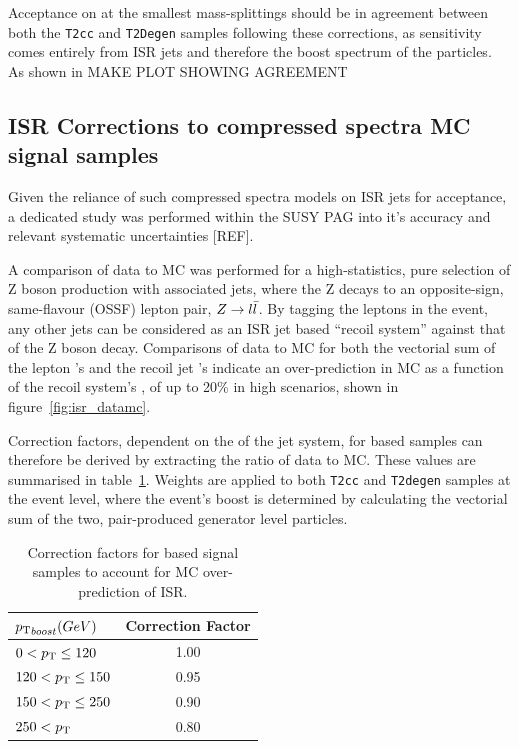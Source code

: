 Acceptance on at the smallest mass-splittings should be in agreement between 
both the \texttt{T2cc} and \texttt{T2Degen} samples following these corrections,
as sensitivity comes entirely from ISR jets and therefore the boost spectrum of 
the \sTop particles. As shown in MAKE PLOT SHOWING AGREEMENT

\subsection{ISR Corrections to compressed spectra MC signal samples}
\label{sec:isr_reweighting}

Given the reliance of such compressed spectra models on ISR jets for acceptance,
a dedicated study was performed within the SUSY PAG into it's accuracy and 
relevant systematic uncertainties [REF].

A comparison of data to MC was performed for a high-statistics, pure selection of Z boson 
production with associated jets, where the Z decays to an opposite-sign,
same-flavour (OSSF) lepton pair, $Z\rightarrow l\bar{l}$. By tagging the leptons in 
the event, any other jets can be considered as an ISR jet based ``recoil system'' 
against that of the Z boson decay. Comparisons of data to MC for both the 
vectorial sum of the lepton \Ptvect's and the recoil jet \Ptvect's indicate an
over-prediction in MC as a function of the recoil system's \Pt, of up to 20\% in 
high \Pt scenarios, shown in figure~\ref{fig:isr_datamc}.

Correction factors, dependent on the \Pt of the jet system, for \MADGRAPH based
samples can therefore be derived by extracting the ratio of data to MC. These 
values are summarised in table~\ref{tab:isr_weights}. Weights are applied to 
both \texttt{T2cc} and \texttt{T2degen} samples at the event level, where the 
event's boost \Pt is determined by calculating the vectorial sum of the 
two, pair-produced generator level \sTop particles.

\begin{table}[ht!]
  \caption{Correction factors for \MADGRAPH based signal samples to account for 
  MC over-prediction of ISR.\label{tab:isr_weights}}
  \centering
  \small
  \begin{tabular}{ lc }
    \hline
    \hline
    ${p_{\text T}}_{boost} (GeV)$    & Correction Factor \\
    \hline
    $0 <{p_{\text T}}\leq120    $          & 1.00 \\
    $120 <{p_{\text T}}\leq150  $          & 0.95 \\
    $150 <{p_{\text T}}\leq250  $          & 0.90 \\
    $250 < {p_{\text T}}        $          & 0.80 \\    
    \hline
    \hline
  \end{tabular}
\end{table}

